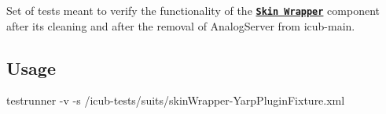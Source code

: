 Set of tests meant to verify the functionality of the \href{http://wiki.icub.org/iCub/main/dox/html/classskinWrapper.html}{\tt {\bfseries Skin Wrapper}} component after its cleaning and after the removal of Analog\+Server from icub-\/main.

\subsection*{Usage }

{\ttfamily testrunner -\/v -\/s /icub-\/tests/suits/skin\+Wrapper-\/\+Yarp\+Plugin\+Fixture.xml} 
